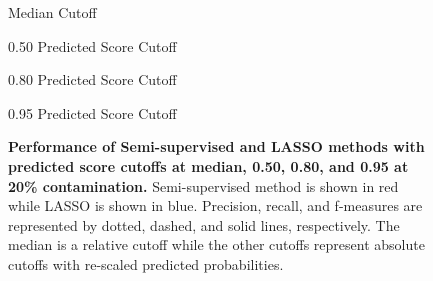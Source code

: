 \documentclass{bmcart}
\def\texttt{[image: ]}
\begin{document}
\begin{backmatter}
\begin{figure}[ht]
    \centering
        \caption{Median Cutoff}
        \caption{0.50 Predicted Score Cutoff}
        \caption{0.80 Predicted Score Cutoff}
        \caption{0.95 Predicted Score Cutoff}
    \vspace{1cm}
    \caption{\textbf{Performance of Semi-supervised and LASSO methods with predicted score cutoffs at median, 0.50, 0.80, and 0.95 at 20\% contamination.} Semi-supervised method is shown in red while LASSO is shown in blue. Precision, recall, and f-measures are represented by dotted, dashed, and solid lines, respectively. The median is a relative cutoff while the other cutoffs represent absolute cutoffs with re-scaled predicted probabilities.}
    \label{fig:perf20}
\end{figure}



\end{backmatter}
\end{document}
